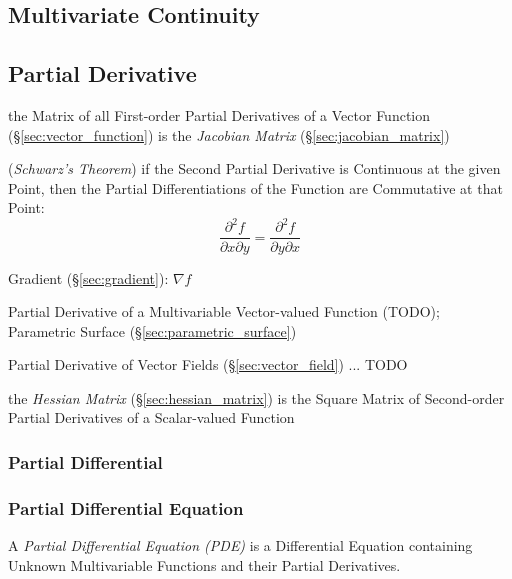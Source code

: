 \subsection{Multivariate Continuity}\label{sec:multivariate_continuity}

\subsection{Partial Derivative}\label{sec:partial_derivative}

the Matrix of all First-order Partial Derivatives of a Vector Function
(\S\ref{sec:vector_function}) is the \emph{Jacobian Matrix}
(\S\ref{sec:jacobian_matrix})

(\emph{Schwarz's Theorem}) if the Second Partial Derivative is Continuous at the
given Point, then the Partial Differentiations of the Function are Commutative
at that Point:
\[
  \frac{\partial^2f}{\partial{x}\partial{y}}
    = \frac{\partial^2f}{\partial{y}\partial{x}}
\]

Gradient (\S\ref{sec:gradient}): $\nabla f$

Partial Derivative of a Multivariable Vector-valued Function (TODO); Parametric
Surface (\S\ref{sec:parametric_surface})

Partial Derivative of Vector Fields (\S\ref{sec:vector_field}) ... TODO

the \emph{Hessian Matrix} (\S\ref{sec:hessian_matrix}) is the Square Matrix of
Second-order Partial Derivatives of a Scalar-valued Function



\subsubsection{Partial Differential}\label{sec:partial_differential}

\subsubsection{Partial Differential Equation}\label{sec:pde}

A \emph{Partial Differential Equation (PDE)} is a Differential Equation
containing Unknown Multivariable Functions and their Partial Derivatives.


